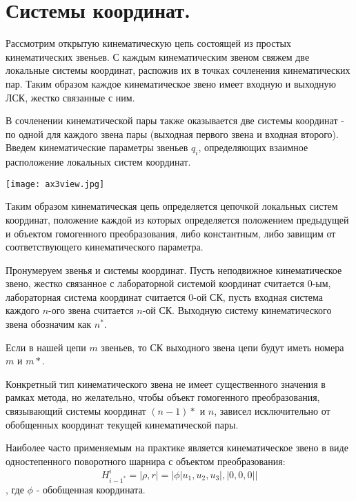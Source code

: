 \section{Системы координат.}

Рассмотрим открытую кинематическую цепь состоящей из простых кинематических звеньев. С каждым кинематическим звеном свяжем две локальные системы координат, распожив их в точках сочленения кинематических пар. Таким образом каждое кинематическое звено имеет входную и выходную ЛСК, жестко связанные с ним.

В сочленении кинематической пары также оказывается две системы координат - по одной для каждого звена пары (выходная первого звена и входная второго). Введем кинематические параметры звеньев $q_i$, определяющих взаимное расположение локальных систем координат.

\begin{center}
  \texttt{[image: ax3view.jpg]}
  \label{}
\end{center}

Таким образом кинематическая цепь определяется цепочкой локальных систем координат, положение каждой из которых определяется положением предыдущей и объектом гомогенного преобразования, либо константным, либо завищим от соответствующего кинематического параметра.

Пронумеруем звенья и системы координат. Пусть неподвижное кинематическое звено, жестко связанное с лабораторной системой координат считается 0-ым, лабораторная система координат считается 0-ой СК, пусть входная система каждого $n$-ого звена считается $n$-ой СК. Выходную систему кинематического звена обозначим как $n^*$. 

Если в нашей цепи $m$ звеньев, то СК выходного звена цепи будут иметь номера $m$ и $m*$.

Конкретный тип кинематического звена не имеет существенного значения в рамках метода, но желательно, чтобы объект гомогенного преобразования, связывающий системы координат $(n-1)*$ и $n$, зависел исключительно от обобщенных координат текущей кинематической пары.

Наиболее часто применяемым на практике является кинематическое звено в виде одностепенного поворотного шарнира с объектом преобразования:
\begin{equation}
H^i_{{i-1}^*} = |\rho, r| = |\phi|u_1, u_2, u_3|, |0, 0, 0||
\end{equation}, где $\phi$ - обобщенная координата.

